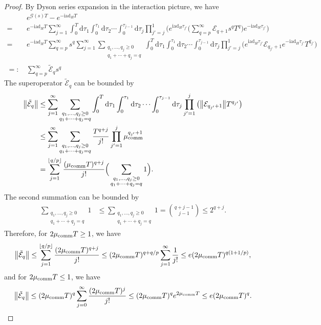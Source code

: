 \documentclass[11pt]{article}
\renewcommand{\i}{\mathrm{i}}
\renewcommand{\d}{\mathrm{d}}
\newcommand{\ad}{\mathrm{ad}}
\newcommand{\G}{\mathcal{G}}
\newcommand{\E}{\mathcal{E}}
\begin{document}
\begin{proof}
By Dyson series expansion in the interaction picture, we have 
\begin{align*}
    &e^{\G(s) T}-e^{-\i \ad_H T} \\
    = \ & e^{-\i \ad_H T}  \sum_{j=1}^{\infty} \int_{0}^T \d \tau_1 \int_{0}^{\tau_1}\d \tau_2 \cdots \int_{0}^{\tau_{j-1}}\d \tau_j \prod_{j'=j}^{1}\bigg(e^{\i\ad_H \tau_{j'}}\bigg(\sum_{q=p}^{\infty}\E_{q+1}s^qT^q\bigg)e^{-\i \ad_H \tau_{j'}}\bigg) \\
    = \ &  e^{-\i \ad_H T}\sum_{q = p}^{\infty}s^{q} \sum_{j=1}^{\infty} \sum_{\substack{q_1,\ldots,q_j \ge 0 \\ q_1+\cdots+q_j=q}} \int_{0}^T \d \tau_1 \int_{0}^{\tau_1}\d \tau_2 \cdots \int_{0}^{\tau_{j-1}}\d \tau_j \prod_{j'=j}^{1}\bigg(e^{\i\ad_H \tau_{j'}}\E_{q_{j'}+1}e^{-\i \ad_H \tau_{j'}}T^{q_{j'}}\bigg)\\
    =:\,& \sum_{q=p}^{\infty}\tilde{\E}_{q} s^q   
\end{align*}
The superoperator $\tilde{\E}_{q}$ can be bounded by \begin{align*}
    \big\|\tilde{\E}_{q}\big\|&\le \sum_{j=1}^{\infty} \sum_{\substack{q_1,\ldots,q_j \ge 0 \\ q_1+\cdots+q_j=q}} \int_{0}^T \d \tau_1 \int_{0}^{\tau_1}\d \tau_2 \cdots \int_{0}^{\tau_{j-1}}\d \tau_j \prod_{j'=1}^{j}\big(\big\|\E_{q_{j'}+1}\big\|T^{q_{j'}}\big) \\
    &\le  \sum_{j=1}^{\infty} \sum_{\substack{q_1,\ldots,q_j \ge 0 \\ q_1+\cdots+q_j=q}}\frac{T^{q+j}}{j!}\prod_{j'=1}^{j}\mu_{\rm comm}^{q_{j'}+1} \\
    &=\sum_{j=1}^{\lfloor q/p\rfloor }\frac{(\mu_{\rm comm}T)^{q+j}}{j!}\Big(\sum_{\substack{q_1,\ldots,q_j \ge 0 \\ q_1+\cdots+q_j=q}} 1\Big).
\end{align*}
The second summation can be bounded by \begin{align*}
    \sum_{\substack{q_1,\ldots,q_j \ge 0 \\ q_1+\cdots+q_j=q}} 1 &\le \sum_{\substack{ q_1,\ldots,q_j \ge 0 \\ q_1+\cdots+q_j=q}} 1=\binom{q+j-1}{j-1} \le 2^{q+j}.
\end{align*}
Therefore, for $2\mu_{\rm comm}T\ge 1$, we have \begin{align*}
    \big\|\tilde{\E}_{q}\big\|\le \sum_{j=1}^{\lfloor q/p\rfloor }\frac{(2\mu_{\rm comm}T)^{q+j}}{j!} 
    \le (2\mu_{\rm comm}T)^{q+q/p}\sum_{j=1}^{\infty}\frac{1}{j!}\le e(2\mu_{\rm comm}T)^{q(1+1/p)} ,
\end{align*}
and for $2\mu_{\rm comm}T\le 1$, we have \begin{align*}
    \big\|\tilde{\E}_{q}\big\| \le (2\mu_{\rm comm}T)^{q}\sum_{j=0}^{\infty}\frac{ (2\mu_{\rm comm}T)^{j}}{j!}\le (2\mu_{\rm comm}T)^{q} e^{2\mu_{\rm comm}T}\le e(2\mu_{\rm comm}T)^{q}.
\end{align*}
\end{proof}
\end{document}
